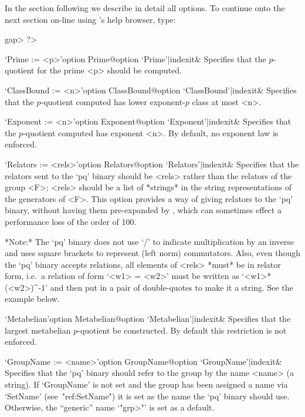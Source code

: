 In the section following we describe in detail all {\ANUPQ}  options.  To
continue onto the next section on-line using {\GAP}'s help browser, type:

\begintt
gap> ?>
\endtt


\beginitems

\>`Prime := <p>'{option Prime}@{option `Prime'|indexit}&
Specifies that the $p$-quotient for the prime  <p>  should  be  computed.

\>`ClassBound := <n>'{option ClassBound}@{option `ClassBound'|indexit}&
Specifies that the $p$-quotient computed has lower exponent-$p$ class  at
most <n>.

\>`Exponent := <n>'{option Exponent}@{option `Exponent'|indexit}&
Specifies that the $p$-quotient computed has exponent <n>. By default, no
exponent law is enforced.

\>`Relators := <rels>'{option Relators}@{option `Relators'|indexit}&
Specifies that the relators sent to the  `pq'  binary  should  be  <rels>
rather than the relators of the group <F>; <rels> should  be  a  list  of
*strings* in the string representations of the generators  of  <F>.  This
option provides a way of giving relators  to  the  `pq'  binary,  without
having  them  pre-expanded  by  {\GAP},  which  can  sometimes  effect  a
performance loss of the order of 100.

*Note:*
The `pq' binary does not use `/' to indicate multiplication by an inverse
and uses square brackets to represent (left norm) commutators. Also, even
though the `pq' binary accepts relations, all elements of  <rels>  *must*
be in relator form, i.e.~a relation of form `<w1> = <w2>' must be written
as `<w1>*(<w2>)^-1' and then put in a pair of double-quotes to make it  a
string. See the example below.

\>`Metabelian'{option Metabelian}@{option `Metabelian'|indexit}&
Specifies that the largest metabelian  $p$-quotient  be  constructed.  By
default this restriction is not enforced.

\>`GroupName := <name>'{option GroupName}@{option `GroupName'|indexit}&
Specifies that the `pq' binary should refer to  the  group  by  the  name
<name> (a string). If `GroupName' is not  set  and  the  group  has  been
assigned a name via `SetName' (see~"ref:SetName") it is set as  the  name
the `pq' binary should use. Otherwise, the ``generic'' name `"\<grp>"' is
set as a default.


